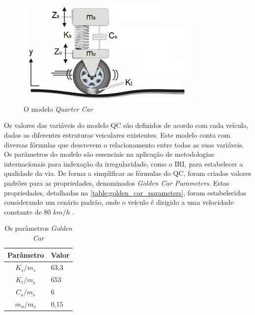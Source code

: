 \begin{figure}[h]
  \centering
  \caption{O modelo \textit{Quarter Car}}
   \label{fig:quarter_car}
   \includegraphics[width=0.8\textwidth]{figuras/fig_4.png}
\end{figure}

Os valores das variáveis do modelo QC são definidos de acordo com cada veículo, dadas as diferentes estruturas veiculares existentes. Este modelo conta com diversas fórmulas que descrevem o relacionamento entre todas as suas variáveis. Os parâmetros do modelo são essenciais na aplicação de metodologias internacionais para indexação da irregularidade, como o IRI, para estabelecer a qualidade da via. De forma a simplificar as fórmulas do QC, foram criados valores padrões para as propriedades, denominados \textit{Golden Car Parameters}. Estas propriedades, detalhadas na \autoref{table:golden_car_parameters}, foram estabelecidas considerando um cenário padrão, onde o veículo é dirigido a uma velocidade constante de 80 $km/h$ \cite{Loizos2008}.

\begin{table}[h]
    \caption{Os parâmetros \textit{Golden Car}}
    \label{table:golden_car_parameters}
    \centering
    \small
    \begin{tabular}{cl}
        \toprule
        \textbf{Parâmetro} & \textbf{Valor} \\
        \toprule
        $K_s/m_s$ & 63,3 \\
        \midrule
        $K_t/m_s$ & 653 \\
        \midrule
        $C_s/m_s$ & 6 \\
        \midrule
        $m_u/m_s$ & 0,15 \\
        \bottomrule
    \end{tabular}
\end{table}

